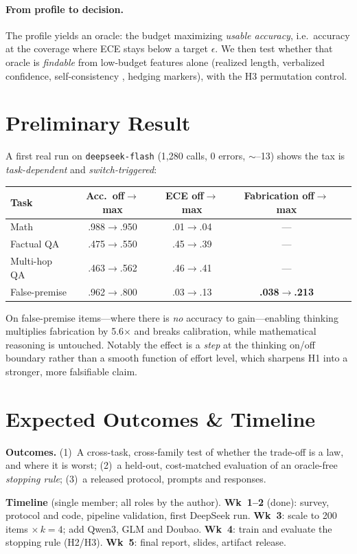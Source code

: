 \documentclass[11pt]{article}
\begin{document}
\paragraph{From profile to decision.} The profile yields an oracle: the budget
maximizing \emph{usable accuracy}, i.e.\ accuracy at the coverage where ECE
stays below a target $\epsilon$. We then test whether that oracle is
\emph{findable} from low-budget features alone (realized length, verbalized
confidence, self-consistency \citep{Manakul2023SelfCheckGPT}, hedging markers),
with the H3 permutation control.

\section{Preliminary Result}
A first real run on \texttt{deepseek-flash} (1{,}280 calls, 0 errors,
${\sim}$--13) shows the tax is \emph{task-dependent} and
\emph{switch-triggered}:
\begin{center}\small
\begin{tabular}{lcccc}
\hline
Task & Acc.\ off$\to$max & ECE off$\to$max & Fabrication off$\to$max \\
\hline
Math          & .988$\to$.950 & .01$\to$.04 & --- \\
Factual QA    & .475$\to$.550 & .45$\to$.39 & --- \\
Multi-hop QA  & .463$\to$.562 & .46$\to$.41 & --- \\
False-premise & .962$\to$.800 & .03$\to$.13 & \textbf{.038$\to$.213} \\
\hline
\end{tabular}
\end{center}
On false-premise items---where there is \emph{no} accuracy to gain---enabling
thinking multiplies fabrication by 5.6$\times$ and breaks calibration, while
mathematical reasoning is untouched. Notably the effect is a \emph{step} at the
thinking on/off boundary rather than a smooth function of effort level, which
sharpens H1 into a stronger, more falsifiable claim.

\section{Expected Outcomes \& Timeline}
\textbf{Outcomes.} (1)~A cross-task, cross-family test of whether the
trade-off is a law, and where it is worst; (2)~a held-out, cost-matched
evaluation of an oracle-free \emph{stopping rule}; (3)~a released protocol,
prompts and responses.

\textbf{Timeline} (single member; all roles by the author).
\textbf{Wk~1--2} (done): survey, protocol and code, pipeline validation, first
DeepSeek run. \textbf{Wk~3}: scale to 200 items $\times\,k{=}4$; add Qwen3,
GLM and Doubao. \textbf{Wk~4}: train and evaluate the stopping rule (H2/H3).
\textbf{Wk~5}: final report, slides, artifact release.


\end{document}
